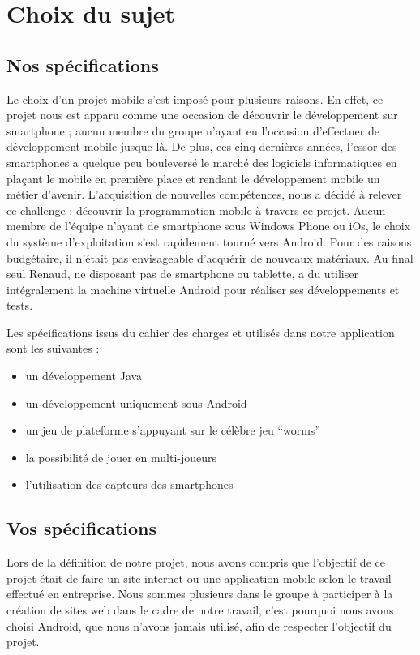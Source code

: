 \documentclass{report}
\begin{document}
\section{Choix du sujet}

\subsection{Nos spécifications}

Le choix d’un projet mobile s’est imposé pour plusieurs raisons. 
En effet, ce projet nous est apparu comme une occasion de découvrir le développement sur smartphone ; aucun membre du groupe n’ayant eu l’occasion d'effectuer de développement mobile jusque là. De plus, ces cinq dernières années, l'essor des smartphones a quelque peu bouleversé le marché des logiciels informatiques en plaçant le mobile en première place et rendant le développement mobile un métier d’avenir.
L’acquisition de nouvelles compétences, nous a décidé à relever ce challenge : découvrir la programmation mobile à travers ce projet. 
Aucun membre de l’équipe n’ayant de smartphone sous Windows Phone ou iOs, le choix du système d’exploitation s’est rapidement tourné vers Android. Pour des raisons budgétaire, il n’était pas envisageable d’acquérir de nouveaux matériaux.
Au final seul Renaud, ne disposant pas de smartphone ou tablette, a du utiliser intégralement la machine virtuelle Android pour réaliser ses développements et tests.

Les spécifications issus du cahier des charges et utilisés dans notre application sont les suivantes :
\begin{itemize}
\item un développement Java
\item un développement uniquement sous Android 
\item un jeu de plateforme s’appuyant sur le célèbre jeu “worms”
\item la possibilité de jouer en multi-joueurs
\item l’utilisation des capteurs des smartphones
\end{itemize}

\subsection{Vos spécifications}
Lors de la définition de notre projet, nous avons compris que l’objectif de ce projet était de faire un site internet ou une application mobile selon le travail effectué en entreprise. Nous sommes plusieurs dans le groupe à participer à la création de sites web dans le cadre de notre travail, c’est pourquoi nous avons choisi Android, que nous n’avons jamais utilisé, afin de respecter l’objectif du projet.
\end{document}
